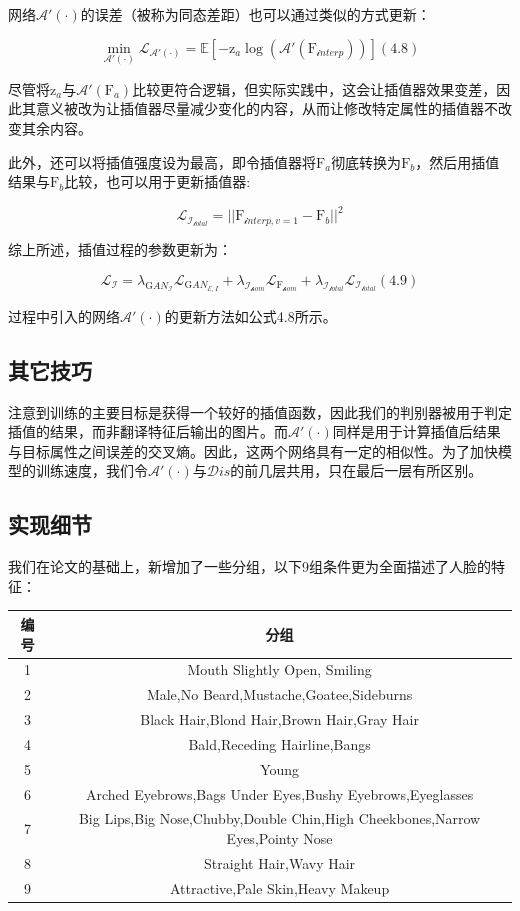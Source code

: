\documentclass[UTF8,a4paper，12pt]{article}
\def\MC {\mathcal}
\theoremstyle{theorem}
\theoremstyle{definition}
\begin{document}
网络$\MC A'(\cdot)$的误差（被称为同态差距）也可以通过类似的方式更新：

$$\min_ {\MC A'(\cdot)} \MC L_{\MC A'(\cdot)} = \mathbb E [-\mathrm z_a\log(\MC A'(\mathrm F_{\MC interp}))]    (4.8)$$

尽管将$\mathrm z_a$与$\MC A'(\mathrm F_a)$比较更符合逻辑，但实际实践中，这会让插值器效果变差，因此其意义被改为让插值器尽量减少变化的内容，从而让修改特定属性的插值器不改变其余内容。

此外，还可以将插值强度设为最高，即令插值器将$\mathrm F_a$彻底转换为$\mathrm F_b$，然后用插值结果与$\mathrm F_b$比较，也可以用于更新插值器:

$$\MC L_{\MC I_{\MC total}} = ||\mathrm F_{\MC interp,v=1} - \mathrm F_b||^2$$

综上所述，插值过程的参数更新为：

$$\MC L_{\MC I} = \lambda_{\mathrm GAN_{\MC I}}\MC L_{\mathrm GAN_{\MC E,I}} + \lambda_{\MC I_{\MC hom}}\MC L_{\mathrm F_{\MC hom}} + \lambda_{\MC I_{\MC total}}\MC L_{\MC I_{\MC total}}    (4.9)$$

过程中引入的网络$\MC A'(\cdot)$的更新方法如公式4.8所示。

\subsection{其它技巧}

注意到训练的主要目标是获得一个较好的插值函数，因此我们的判别器被用于判定插值的结果，而非翻译特征后输出的图片。而$\MC A'(\cdot)$同样是用于计算插值后结果与目标属性之间误差的交叉熵。因此，这两个网络具有一定的相似性。为了加快模型的训练速度，我们令$\MC A'(\cdot)$与$\MC Dis$的前几层共用，只在最后一层有所区别。
\subsection{实现细节}

我们在论文的基础上，新增加了一些分组，以下9组条件更为全面描述了人脸的特征：

\begin{tabular}{c|c}
  编号 & 分组 \\
  \hline
  1 & Mouth Slightly Open, Smiling \\
  2 & Male,No Beard,Mustache,Goatee,Sideburns \\
 3 & Black Hair,Blond Hair,Brown Hair,Gray Hair\\
 4 & Bald,Receding Hairline,Bangs\\
 5 & Young\\
 6 & Arched Eyebrows,Bags Under Eyes,Bushy Eyebrows,Eyeglasses\\
 7 & Big Lips,Big Nose,Chubby,Double Chin,High Cheekbones,Narrow Eyes,Pointy Nose\\
 8 & Straight Hair,Wavy Hair\\
 9 & Attractive,Pale Skin,Heavy Makeup
\end{tabular}
\end{document}
